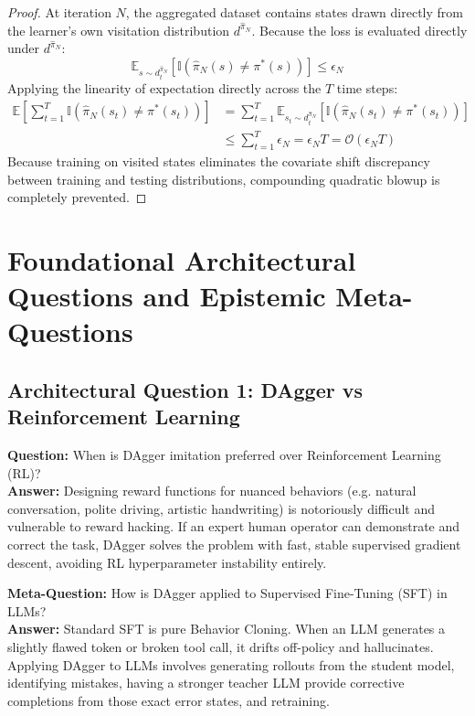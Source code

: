 \documentclass[11pt,a4paper]{article}
\theoremstyle{definition}
\begin{document}
\begin{proof}
At iteration $N$, the aggregated dataset contains states drawn directly from the learner's own visitation distribution $d^{\hat{\pi}_N}$.
Because the loss is evaluated directly under $d^{\hat{\pi}_N}$:
{\boldmath
\begin{equation}
\mathbb{E}_{s \sim d_t^{\hat{\pi}_N}}\left[ \mathbb{I}(\hat{\pi}_N(s) \ne \pi^*(s)) \right] \le \epsilon_N
\end{equation}
}
Applying the linearity of expectation directly across the $T$ time steps:
{\boldmath
\begin{align}
\mathbb{E}\left[ \sum_{t=1}^T \mathbb{I}(\hat{\pi}_N(s_t) \ne \pi^*(s_t)) \right] &= \sum_{t=1}^T \mathbb{E}_{s_t \sim d_t^{\hat{\pi}_N}}\left[ \mathbb{I}(\hat{\pi}_N(s_t) \ne \pi^*(s_t)) \right] \\
&\le \sum_{t=1}^T \epsilon_N = \epsilon_N T = \mathcal{O}(\epsilon_N T)
\end{align}
}
Because training on visited states eliminates the covariate shift discrepancy between training and testing distributions, compounding quadratic blowup is completely prevented.
\end{proof}

\section{Foundational Architectural Questions and Epistemic Meta-Questions}

\subsection{Architectural Question 1: DAgger vs Reinforcement Learning}
\textbf{Question:} When is DAgger imitation preferred over Reinforcement Learning (RL)?\\
\textbf{Answer:} Designing reward functions for nuanced behaviors (e.g. natural conversation, polite driving, artistic handwriting) is notoriously difficult and vulnerable to reward hacking. If an expert human operator can demonstrate and correct the task, DAgger solves the problem with fast, stable supervised gradient descent, avoiding RL hyperparameter instability entirely.

\textbf{Meta-Question:} How is DAgger applied to Supervised Fine-Tuning (SFT) in LLMs?\\
\textbf{Answer:} Standard SFT is pure Behavior Cloning. When an LLM generates a slightly flawed token or broken tool call, it drifts off-policy and hallucinates. Applying DAgger to LLMs involves generating rollouts from the student model, identifying mistakes, having a stronger teacher LLM provide corrective completions from those exact error states, and retraining.
\end{document}
